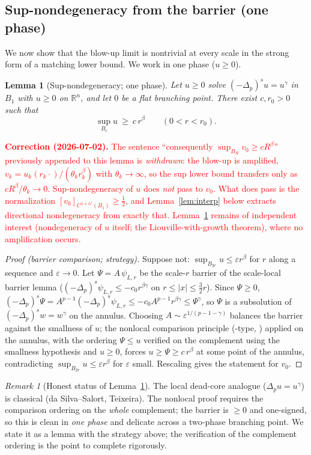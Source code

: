 \documentclass[11pt]{amsart}
\theoremstyle{plain}
\newtheorem{lemma}[theorem]{Lemma}
\theoremstyle{definition}
\theoremstyle{remark}
\newtheorem{remark}[theorem]{Remark}
\newcommand{\R}{\mathbb{R}}
\newcommand{\fpl}[1]{(-\Delta_p)^{s}#1}
\newcommand{\al}{\alpha}
\begin{document}
\subsection{Sup-nondegeneracy from the barrier (one phase)}
We now show that the blow-up limit is nontrivial at every scale in the strong
form of a matching lower bound. We work in one phase ($u\ge0$).

\begin{lemma}[Sup-nondegeneracy; one phase]\label{lem:supnd}
Let $u\ge0$ solve $\fpl{u}=u^{\gamma}$ in $B_1$ with $u\ge0$ on $\R^n$, and let
$0$ be a flat branching point. There exist $c,r_0>0$ such that
\[
  \sup_{B_r}u\ \ge\ c\,r^{\beta}\qquad(0<r<r_0).
\]
\end{lemma}
\noindent\textcolor{red}{\textbf{Correction (2026-07-02).} The sentence
``consequently $\sup_{B_R}v_0\ge cR^\beta$'' previously appended to this lemma
is \emph{withdrawn}: the blow-up is amplified,
$v_k=u_k(r_k\cdot)/(\theta_kr_k^\beta)$ with $\theta_k\to\infty$, so the sup
lower bound transfers only as $cR^\beta/\theta_k\to0$. Sup-nondegeneracy of $u$
does \emph{not} pass to $v_0$. What does pass is the normalization
$[v_0]_{C^{1+\al'}(B_1)}\ge\frac12$, and Lemma~\ref{lem:interp} below extracts
directional nondegeneracy from exactly that. Lemma~\ref{lem:supnd} remains of
independent interest (nondegeneracy of $u$ itself; the Liouville-with-growth
theorem), where no amplification occurs.}
\begin{proof}[Proof (barrier comparison; strategy)]
Suppose not: $\sup_{B_{2r}}u\le\varepsilon r^{\beta}$ for $r$ along a sequence
and $\varepsilon\to0$. Let $\Psi=A\,\psi_{L,r}$ be the scale-$r$ barrier of the
scale-local barrier lemma \textnormal{(}$\fpl{\psi_{L,r}}\le-c_0r^{\beta\gamma}$
on $r\le|x|\le\tfrac32r$\textnormal{)}. Since $\Psi\ge0$,
$\fpl{\Psi}=A^{p-1}\fpl{\psi_{L,r}}\le -c_0A^{p-1}r^{\beta\gamma}\le
\Psi^{\gamma}$, so $\Psi$ is a subsolution of $\fpl{w}=w^{\gamma}$ on the
annulus. Choosing $A\sim\varepsilon^{1/(p-1-\gamma)}$ balances the barrier
against the smallness of $u$; the nonlocal comparison principle
(\cite[Thm 2.1]{PTU}-type, \cite{KKL}) applied on the annulus, with the ordering
$\Psi\le u$ verified on the complement using the smallness hypothesis and
$u\ge0$, forces $u\ge\Psi\ge c\,r^{\beta}$ at some point of the annulus,
contradicting $\sup_{B_{2r}}u\le\varepsilon r^{\beta}$ for $\varepsilon$ small.
Rescaling gives the statement for $v_0$.
\end{proof}

\begin{remark}[Honest status of Lemma~\ref{lem:supnd}]\label{rem:supnd}
The local dead-core analogue ($\Delta_p u=u^{\gamma}$) is classical
(da Silva--Salort, Teixeira). The nonlocal proof requires the comparison
ordering on the \emph{whole} complement; the barrier is $\ge0$ and one-signed,
so this is clean in \emph{one phase} and delicate across a two-phase branching
point. We state it as a lemma with the strategy above; the verification of the
complement ordering is the point to complete rigorously.
\end{remark}
\end{document}

